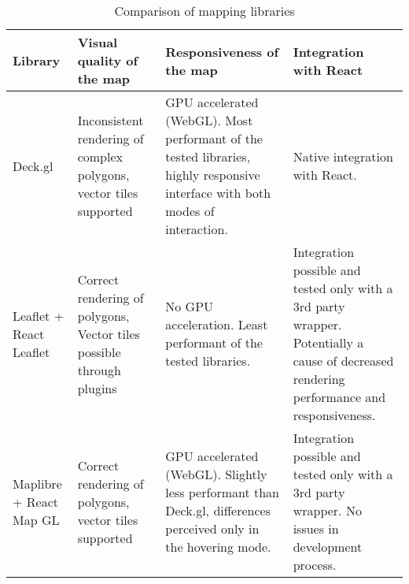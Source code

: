 \begin{table}[H]
	\caption{Comparison of mapping libraries}
	\label{tab:map library comparison}
	\centering
	\begin{tabular}{ | L{0.13\textwidth} | L{0.25\textwidth} | L{0.25\textwidth} | L{0.25\textwidth} | }
		\hline
		\textbf{Library}
		& \textbf{Visual quality of the map}
		& \textbf{Responsiveness of the map}
		& \textbf{Integration with React}
		\\
		\hline
		\hline
		Deck.gl
		& Inconsistent rendering of complex polygons, vector tiles supported
		& GPU accelerated (WebGL). Most performant of the tested libraries,
		highly responsive interface with both modes of interaction.
		& Native integration with React.
		\\
		\hline
		Leaflet + React Leaflet
		& Correct rendering of polygons, Vector tiles possible through plugins
		& No GPU acceleration. Least performant of the tested libraries.
		& Integration possible and tested only with a 3rd party wrapper.
		Potentially a cause of decreased rendering performance and responsiveness.
		\\
		\hline
		Maplibre + React Map GL
		& Correct rendering of polygons, vector tiles supported
		& GPU accelerated (WebGL). Slightly less performant than Deck.gl,
		differences perceived only in the hovering mode.
		& Integration possible and tested only with a 3rd party wrapper.
		No issues in development process.
		\\
		\hline
	\end{tabular}
\end{table}

